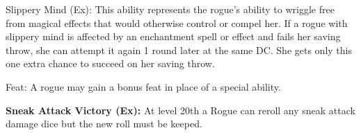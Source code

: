 \begin{description*}
\item[Slippery Mind (Ex):] This ability represents the rogue's ability to wriggle free from magical effects that would otherwise control or compel her. If a rogue with slippery mind is affected by an enchantment spell or effect and fails her saving throw, she can attempt it again 1 round later at the same DC. She gets only this one extra chance to succeed on her saving throw.

\item[Feat:] A rogue may gain a bonus feat in place of a special ability.
\end{description*}

\textbf{Sneak Attack Victory (Ex):} At level 20th a Rogue can reroll any sneak attack damage dice but the new roll must be keeped.
